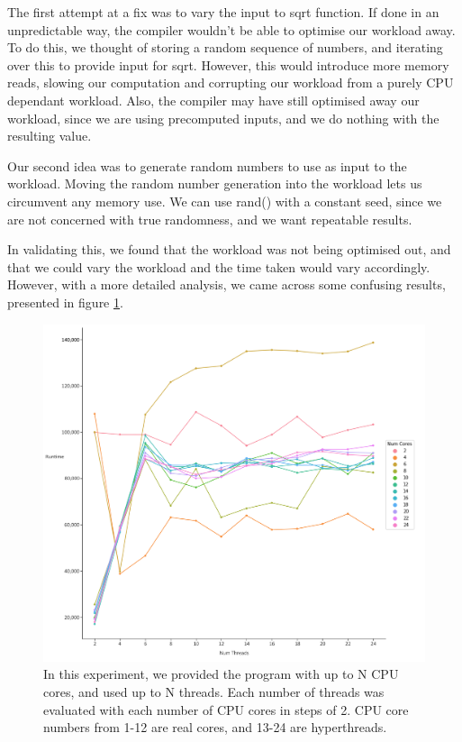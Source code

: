 The first attempt at a fix was to vary the input to sqrt function. If done in an unpredictable way, the compiler wouldn't be able to optimise our workload away. To do this, we thought of storing a random sequence of numbers, and iterating over this to provide input for sqrt. However, this would introduce more memory reads, slowing our computation and corrupting our workload from a purely CPU dependant workload. Also, the compiler may have still optimised away our workload, since we are using precomputed inputs, and we do nothing with the resulting value.

Our second idea was to generate random numbers to use as input to the workload. Moving the random number generation into the workload lets us circumvent any memory use. We can use rand() with a constant seed, since we are not concerned with true randomness, and we want repeatable results.

In validating this, we found that the workload was not being optimised out, and that we could vary the workload and the time taken would vary accordingly. However, with a more detailed analysis, we came across some confusing results, presented in figure \ref{fig:optimal_threads_1}.



\begin{figure}[H]
    \includegraphics[width=1\textwidth]{graphics/optimal_threads_1.png}
    \caption{In this experiment, we provided the program with up to N CPU cores, and used up to N threads. Each number of threads was evaluated with each number of CPU cores in steps of 2. CPU core numbers from 1-12 are real cores, and 13-24 are hyperthreads.}
    \label{fig:optimal_threads_1}
\end{figure}




